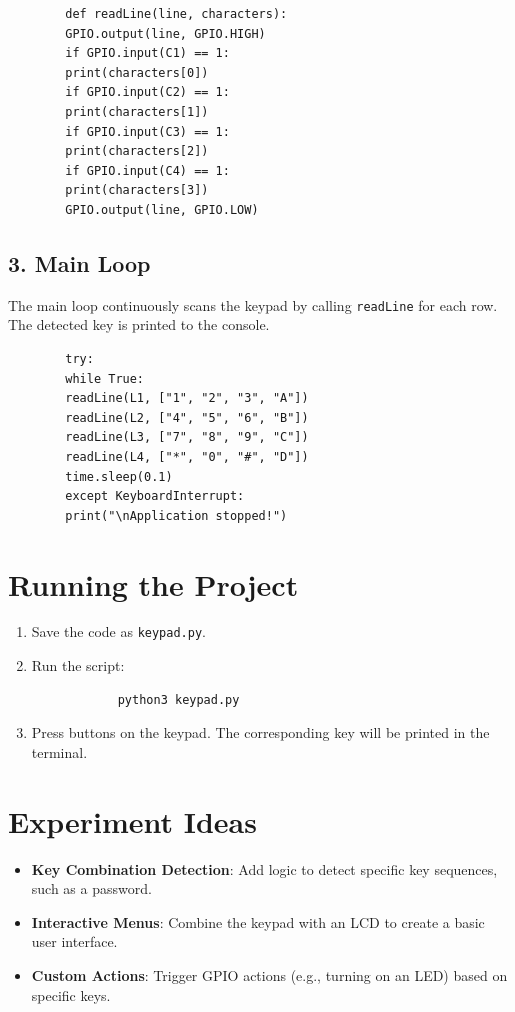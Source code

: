 \documentclass{article}
\begin{document}
	\begin{lstlisting}
		def readLine(line, characters):
		GPIO.output(line, GPIO.HIGH)
		if GPIO.input(C1) == 1:
		print(characters[0])
		if GPIO.input(C2) == 1:
		print(characters[1])
		if GPIO.input(C3) == 1:
		print(characters[2])
		if GPIO.input(C4) == 1:
		print(characters[3])
		GPIO.output(line, GPIO.LOW)
	\end{lstlisting}
	
	\subsection*{3. Main Loop}
	The main loop continuously scans the keypad by calling \texttt{readLine} for each row. The detected key is printed to the console.
	
	\begin{lstlisting}
		try:
		while True:
		readLine(L1, ["1", "2", "3", "A"])
		readLine(L2, ["4", "5", "6", "B"])
		readLine(L3, ["7", "8", "9", "C"])
		readLine(L4, ["*", "0", "#", "D"])
		time.sleep(0.1)
		except KeyboardInterrupt:
		print("\nApplication stopped!")
	\end{lstlisting}
	
	\section*{Running the Project}
	
	\begin{enumerate}
		\item Save the code as \texttt{keypad.py}.
		\item Run the script:
		\begin{lstlisting}
			python3 keypad.py
		\end{lstlisting}
		\item Press buttons on the keypad. The corresponding key will be printed in the terminal.
	\end{enumerate}
	
	\section*{Experiment Ideas}
	\begin{itemize}
		\item \textbf{Key Combination Detection}: Add logic to detect specific key sequences, such as a password.
		\item \textbf{Interactive Menus}: Combine the keypad with an LCD to create a basic user interface.
		\item \textbf{Custom Actions}: Trigger GPIO actions (e.g., turning on an LED) based on specific keys.
	\end{itemize}
	
\end{document}
